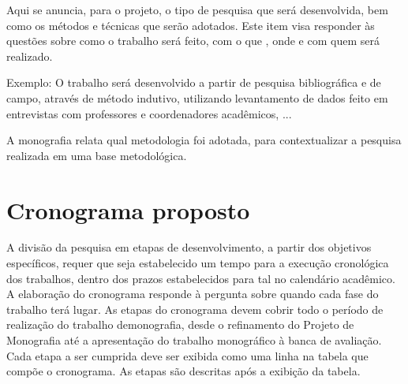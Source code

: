Aqui se anuncia, para o projeto, o tipo de pesquisa que será desenvolvida, bem
como os métodos e técnicas que serão adotados. Este item visa responder às
questões sobre como o trabalho será feito, com o que , onde e com quem será
realizado.

Exemplo: O trabalho será desenvolvido a partir de pesquisa bibliográfica e de
campo, através de método indutivo, utilizando levantamento de dados feito em
entrevistas com professores e coordenadores acadêmicos, ...

A monografia relata qual metodologia foi adotada, para contextualizar a pesquisa
realizada em uma base metodológica.


\section{Cronograma proposto}

A divisão da pesquisa em etapas de desenvolvimento, a partir dos objetivos
específicos, requer que seja estabelecido um tempo para a execução cronológica
dos trabalhos, dentro dos prazos estabelecidos para tal no calendário acadêmico.
A elaboração do cronograma responde à pergunta sobre quando cada fase do
trabalho terá lugar. As etapas do cronograma devem cobrir todo o período de
realização do trabalho demonografia, desde o refinamento do Projeto de
Monografia até a apresentação do trabalho monográfico à banca de avaliação. Cada
etapa a ser cumprida deve ser exibida como uma linha na tabela que compõe o
cronograma. As etapas são descritas após a exibição da tabela.
